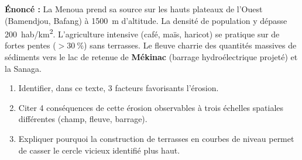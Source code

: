 \documentclass[11pt]{article}
\begin{document}
\begin{exoresolu}
\textbf{Énoncé :} La Menoua prend sa source sur les hauts plateaux de l'Ouest (Bamendjou, Bafang) à \SI{1500}{m} d'altitude. La densité de population y dépasse \SI{200}{hab/km^2}. L'agriculture intensive (café, maïs, haricot) se pratique sur de fortes pentes ($> \SI{30}{\%}$) sans terrasses. Le fleuve charrie des quantités massives de sédiments vers le lac de retenue de \textbf{Mékinac} (barrage hydroélectrique projeté) et la Sanaga.
\begin{enumerate}
    \item Identifier, dans ce texte, 3 facteurs favorisants l'érosion.
    \item Citer 4 conséquences de cette érosion observables à trois échelles spatiales différentes (champ, fleuve, barrage).
    \item Expliquer pourquoi la construction de terrasses en courbes de niveau permet de casser le cercle vicieux identifié plus haut.
\end{enumerate}


\end{exoresolu}
\end{document}
